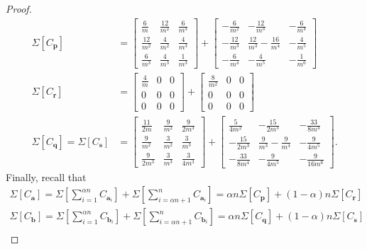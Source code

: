 \documentclass[10pt]{article} %
\theoremstyle{plain}
\newcommand{\bp}{\textbf{p}}
\newcommand{\bq}{\textbf{q}}
\newcommand{\br}{\textbf{r}}
\newcommand{\bs}{\textbf{s}}
\newcommand{\ba}{\textbf{a}}
\newcommand{\bb}{\textbf{b}}
\begin{document}
\begin{proof}
	\begin{align*}
		\Sigma[C_{\bp}] &= 
		\begin{bmatrix}
			\frac{6}{m} & \frac{12}{m^2} & \frac{6}{m^3}\\
			\frac{12}{m^2} & \frac{4}{m^2} & \frac{4}{m^3} \\
			\frac{6}{m^3} & \frac{4}{m^3} & \frac{1}{m^3}
		\end{bmatrix}
		+
		\begin{bmatrix}
			-\frac{6}{m^2} & -\frac{12}{m^3} & -\frac{6}{m^4}\\
			-\frac{12}{m^3} & \frac{12}{m^3}-\frac{16}{m^4} & -\frac{4}{m^5} \\
			-\frac{6}{m^4} & -\frac{4}{m^5} & -\frac{1}{m^6}
		\end{bmatrix} \\
		\Sigma[C_{\br}] &= 
		\begin{bmatrix}
			\frac{4}{m} & 0 & 0\\
			0 & 0 & 0 \\
			0 & 0 & 0
		\end{bmatrix}
		+
		\begin{bmatrix}
			\frac{8}{m^2} & 0 & 0\\
			0 & 0 & 0 \\
			0 & 0 & 0
		\end{bmatrix} \\
		\Sigma[C_{\bq}] = \Sigma[C_{\bs}] &= 
		\begin{bmatrix}
			\frac{11}{2m} & \frac{9}{m^2} & \frac{9}{2m^3}\\
			\frac{9}{m^2} & \frac{3}{m^2} & \frac{3}{m^3} \\
			\frac{9}{2m^3} & \frac{3}{m^3} & \frac{3}{4m^3}
		\end{bmatrix}
		+
		\begin{bmatrix}
			\frac{5}{4m^2} & - \frac{15}{2m^3} & -\frac{33}{8m^4}\\
			- \frac{15}{2m^3} & \frac{9}{m^3}-\frac{9}{m^4} & -\frac{9}{4m^5} \\
			-\frac{33}{8m^4} & -\frac{9}{4m^5} & -\frac{9}{16m^6}
		\end{bmatrix}.
	\end{align*}
	Finally, recall that
	\begin{align*}
		\Sigma[C_{\ba}] = \Sigma\left[\sum_{i=1}^{\alpha n}C_{\ba_i}\right] + \Sigma\left[\sum_{i=\alpha n + 1}^n C_{\ba_i}\right] = \alpha n \Sigma[C_{\bp}] + (1-\alpha)n\Sigma[C_{\br}] \\
		\Sigma[C_{\bb}] = \Sigma\left[\sum_{i=1}^{\alpha n}C_{\bb_i}\right] + \Sigma\left[\sum_{i=\alpha n + 1}^n C_{\bb_i}\right] = \alpha n \Sigma[C_{\bq}] + (1-\alpha)n\Sigma[C_{\bs}]\\

\end{align*}
\end{proof}
\end{document}
